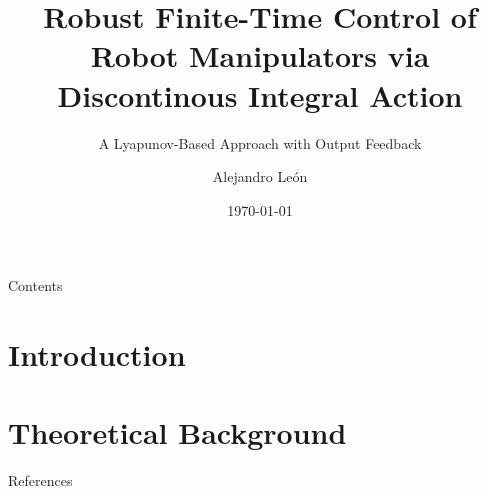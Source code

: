 \documentclass[aspectratio=169,xcolor=dvipsnames]{beamer}
\title{Robust Finite-Time Control of Robot Manipulators via Discontinous Integral Action}
\subtitle{A Lyapunov-Based Approach with Output Feedback}
\author{Alejandro León}
\institute
{
    Instituto de Ingeniería \\
    Universidad Nacional Autónoma de México %
}
\date{\today} %
\begin{document}
\begin{frame}
    \titlepage
\end{frame}

\begin{frame}{Contents}
    \tableofcontents
\end{frame}

\section{Introduction}


\section{Theoretical Background}


\begin{frame}{References}
    \footnotesize
    
    
\end{frame}

\end{document}
